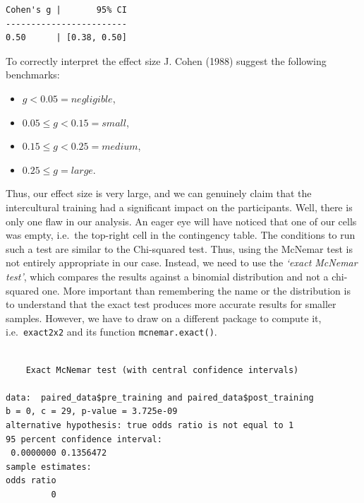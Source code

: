 \documentclass[
  letterpaper,
]{krantz}
\makeatletter
\newenvironment{Shaded}{\begin{snugshade}}{\end{snugshade}}
\newcommand{\FunctionTok}[1]{\textcolor[rgb]{0.28,0.35,0.67}{#1}}
\newcommand{\NormalTok}[1]{\textcolor[rgb]{0.00,0.23,0.31}{#1}}
\newcommand{\SpecialCharTok}[1]{\textcolor[rgb]{0.37,0.37,0.37}{#1}}
\newenvironment{kframe}{%
\medskip{}
\setlength{\fboxsep}{.8em}
 \def\at@end@of@kframe{}%
 \ifinner\ifhmode%
  \def\at@end@of@kframe{\end{minipage}}%
  \begin{minipage}{\columnwidth}%
 \fi\fi%
 \def\FrameCommand##1{\hskip\@totalleftmargin \hskip-\fboxsep
 \colorbox{shadecolor}{##1}\hskip-\fboxsep
     \hskip-\linewidth \hskip-\@totalleftmargin \hskip\columnwidth}%
 \MakeFramed {\advance\hsize-\width
   \@totalleftmargin\z@ \linewidth\hsize
   \@setminipage}}%
 {\par\unskip\endMakeFramed%
 \at@end@of@kframe}
\renewenvironment{Shaded}{\begin{kframe}}{\end{kframe}}
\makeatother
\begin{document}
\begin{verbatim}
Cohen's g |       95% CI
------------------------
0.50      | [0.38, 0.50]
\end{verbatim}

To correctly interpret the effect size J. Cohen (1988) suggest the
following benchmarks:

\begin{itemize}
\item
  \(g < 0.05 = negligible\),
\item
  \(0.05 \leq g < 0.15 = small\),
\item
  \(0.15 \leq g < 0.25 = medium\),
\item
  \(0.25 \leq g = large\).
\end{itemize}

Thus, our effect size is very large, and we can genuinely claim that the
intercultural training had a significant impact on the participants.
Well, there is only one flaw in our analysis. An eager eye will have
noticed that one of our cells was empty, i.e.~the top-right cell in the
contingency table. The conditions to run such a test are similar to the
Chi-squared test. Thus, using the McNemar test is not entirely
appropriate in our case. Instead, we need to use the \emph{`exact
McNemar test'}, which compares the results against a binomial
distribution and not a chi-squared one. More important than remembering
the name or the distribution is to understand that the exact test
produces more accurate results for smaller samples. However, we have to
draw on a different package to compute it, i.e.~\texttt{exact2x2} and
its function \texttt{mcnemar.exact()}.

\begin{Shaded}
\end{Shaded}

\begin{verbatim}

    Exact McNemar test (with central confidence intervals)

data:  paired_data$pre_training and paired_data$post_training
b = 0, c = 29, p-value = 3.725e-09
alternative hypothesis: true odds ratio is not equal to 1
95 percent confidence interval:
 0.0000000 0.1356472
sample estimates:
odds ratio 
         0 
\end{verbatim}
\end{document}
